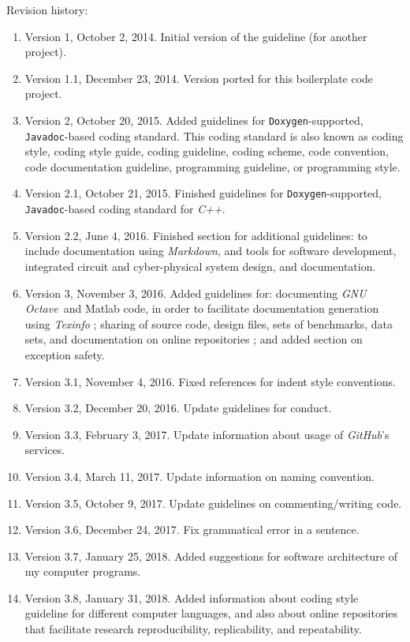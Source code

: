 \documentclass[letter,12pt]{article}
\begin{document}
Revision history: \vspace{-0.3cm}
\begin{enumerate} \itemsep -4pt
\item Version 1, October 2, 2014. Initial version of the guideline (for another project).
\item Version 1.1, December 23, 2014. Version ported for this boilerplate code project.
\item Version 2, October 20, 2015. Added guidelines for {\tt Doxygen}-supported, {\tt Javadoc}-based coding standard. This coding standard is also known as coding style, coding style guide, coding guideline, coding scheme, code convention, code documentation guideline, programming guideline, or programming style.
\item Version 2.1, October 21, 2015. Finished guidelines for {\tt Doxygen}-supported, {\tt Javadoc}-based coding standard for {\it C++}.
\item Version 2.2, June 4, 2016. Finished section for additional guidelines: to include documentation using {\it Markdown}, and tools for software development, integrated circuit and cyber-physical system design, and documentation.
\item Version 3, November 3, 2016. Added guidelines for: documenting {\it GNU Octave}\ and {\sc Matlab} code, in order to facilitate documentation generation using {\it Texinfo} \cite{WikipediaContributors2016h,Stallman2016,Stallman2016a,Stallman2016b}; sharing of source code, design files, sets of benchmarks, data sets, and documentation on online repositories \cite{figshareLLPstaff2016,GitHubStaff2016}; and added section on exception safety.
\item Version 3.1, November 4, 2016. Fixed references for indent style conventions.
\item Version 3.2, December 20, 2016. Update guidelines for conduct.
\item Version 3.3, February 3, 2017. Update information about usage of {\it GitHub}'s services.
\item Version 3.4, March 11, 2017. Update information on naming convention.
\item Version 3.5, October 9, 2017. Update guidelines on commenting/writing code.
\item Version 3.6, December 24, 2017. Fix grammatical error in a sentence.
\item Version 3.7, January 25, 2018. Added suggestions for software architecture of my computer programs.
\item Version 3.8, January 31, 2018. Added information about coding style guideline for different computer languages, and also about online repositories that facilitate research reproducibility, replicability, and repeatability.

\end{enumerate}
\end{document}
